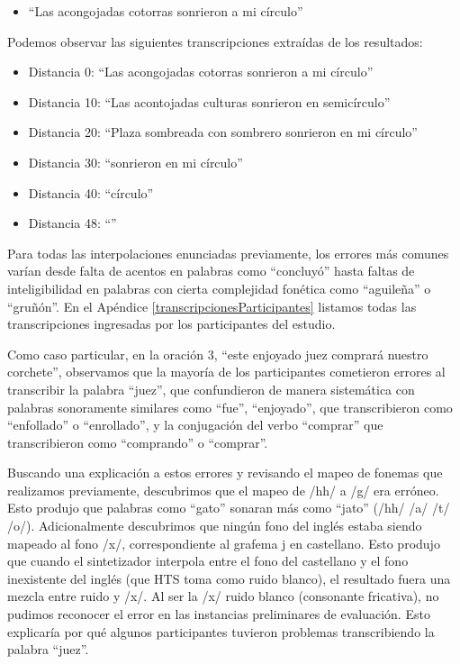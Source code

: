 \begin{itemize}
	\item ``Las acongojadas cotorras sonrieron a mi círculo''
\end{itemize}

Podemos observar las siguientes transcripciones extraídas de los resultados:

\begin{itemize}
	\item Distancia 0: ``Las acongojadas cotorras sonrieron a mi círculo''
	\item Distancia 10: ``Las acontojadas culturas sonrieron en semicírculo''
	\item Distancia 20: ``Plaza sombreada con sombrero sonrieron en mi círculo''
	\item Distancia 30: ``sonrieron en mi círculo''
	\item Distancia 40: ``círculo''
	\item Distancia 48: ``''
\end{itemize}

Para todas las interpolaciones enunciadas previamente, los errores más comunes varían desde falta de acentos en palabras como ``concluyó'' hasta faltas de inteligibilidad en palabras con cierta complejidad fonética como ``aguileña'' o ``gruñón''. En el Apéndice \ref{transcripcionesParticipantes} listamos todas las transcripciones ingresadas por los participantes del estudio.

Como caso particular, en la oración $3$, ``este enjoyado juez comprará nuestro corchete'', observamos que la mayoría de los participantes cometieron errores al transcribir la palabra ``juez'', que confundieron de manera sistemática con palabras sonoramente similares como ``fue'', ``enjoyado'', que transcribieron como ``enfollado'' o ``enrollado'', y la conjugación del verbo ``comprar'' que transcribieron como ``comprando'' o ``comprar''.

Buscando una explicación a estos errores y revisando el mapeo de fonemas que realizamos previamente, descubrimos que el mapeo de /hh/ a /g/ era erróneo. Esto produjo que palabras como ``gato'' sonaran más como ``jato'' (/hh/ /a/ /t/ /o/). Adicionalmente descubrimos que ningún fono del inglés estaba siendo mapeado al fono /x/, correspondiente al grafema j en castellano. Esto produjo que cuando el sintetizador interpola entre el fono del castellano y el fono inexistente del inglés (que HTS toma como ruido blanco), el resultado fuera una mezcla entre ruido y /x/. Al ser la /x/ ruido blanco (consonante fricativa), no pudimos reconocer el error en las instancias preliminares de evaluación. Esto explicaría por qué algunos participantes tuvieron problemas transcribiendo la palabra ``juez''.

